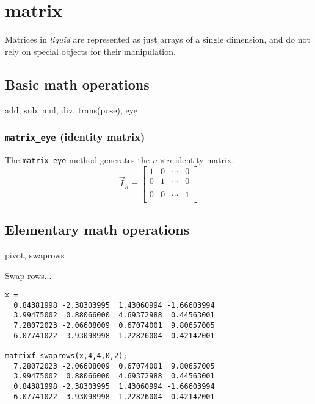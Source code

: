 % 
%
\section{matrix}
\label{module:matrix}
Matrices in {\it liquid} are represented as just arrays of a single dimension,
and do not rely on special objects for their manipulation.


\subsection{Basic math operations}
\label{module:matrix:math}
add, sub, mul, div, trans(pose), eye

\subsubsection{{\tt matrix\_eye} (identity matrix)}
The {\tt matrix\_eye} method generates the $n \times n$ identity matrix.
\[
    \vec{I}_n = 
    \begin{bmatrix}
        1 & 0 & \cdots & 0 \\
        0 & 1 & \cdots & 0 \\
        \\
        0 & 0 & \cdots & 1 \\
    \end{bmatrix}
\]

\subsection{Elementary math operations}
\label{module:matrix:elementary}
pivot, swaprows

Swap rows...
\begin{verbatim}
x = 
  0.84381998 -2.38303995  1.43060994 -1.66603994
  3.99475002  0.88066000  4.69372988  0.44563001
  7.28072023 -2.06608009  0.67074001  9.80657005
  6.07741022 -3.93098998  1.22826004 -0.42142001

matrixf_swaprows(x,4,4,0,2);
  7.28072023 -2.06608009  0.67074001  9.80657005
  3.99475002  0.88066000  4.69372988  0.44563001
  0.84381998 -2.38303995  1.43060994 -1.66603994
  6.07741022 -3.93098998  1.22826004 -0.42142001
\end{verbatim}

